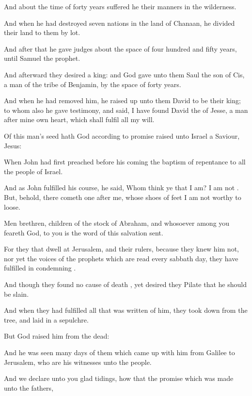 {And
about the
time of forty
years suffered
he their
manners
in the
wilderness.

And when he had
destroyed
seven
nations
in the
land of
Chanaan, he
divided
their
land to
them by
lot.

And
after
that he
gave
{}
judges about the space
of four
hundred
and
fifty
years,
until
Samuel the
prophet.

And
afterward they
desired a
king:
and
God
gave unto
them
Saul the
son of
Cis, a
man
of the
tribe of
Benjamin, by the space of
forty
years.

And when he had
removed
him, he raised
up unto
them
David to
be their
king; to
whom
also he gave
testimony, and
said, I have
found
David
the
{} of
Jesse, a
man
after mine
own
heart,
which shall
fulfil
all
my
will.

Of this
man’s
seed
hath
God according
to
{}
promise
raised unto
Israel a
Saviour,
Jesus:

When
John had first
preached
before
his
coming the
baptism of
repentance to
all the
people of
Israel.

And
as
John
fulfilled his
course, he
said,
Whom think ye
that
I
am?
I
am
not
{}.
But,
behold, there cometh
one
after
me,
whose
shoes
of
{}
feet I
am
not
worthy to
loose.

Men
{}
brethren,
children of the
stock of
Abraham,
and
whosoever
among
you
feareth
God, to
you
is the
word of
this
salvation
sent.

For they that
dwell
at
Jerusalem,
and
their
rulers, because they
knew
him
not, nor
yet the
voices of the
prophets
which are
read
every sabbath
day, they have
fulfilled
{} in
condemning
{}.

And though they
found
no
cause of
death
{}, yet desired
they
Pilate that
he should be
slain.

And
when they had
fulfilled
all that was
written
of
him, they
took
{}
down
from the
tree, and
laid
{}
in a
sepulchre.

But
God
raised
him
from the
dead:

And he was
seen
many
days of them which came up
with
him
from
Galilee
to
Jerusalem,
who
are
his
witnesses
unto the
people.

And
we
declare unto
you glad
tidings, how that the
promise which was
made
unto the
fathers,

}
